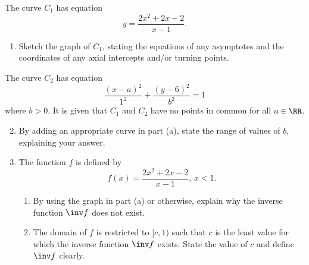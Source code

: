 \begin{problem}
    The curve $C_1$ has equation \[y = \frac{2x^2 + 2x - 2}{x-1}.\]

    \begin{enumerate}
        \item Sketch the graph of $C_1$, stating the equations of any asymptotes and the coordinates of any axial intercepts and/or turning points.
    \end{enumerate}

    The curve $C_2$ has equation \[\frac{(x-a)^2}{1^2} + \frac{(y-6)^2}{b^2} = 1\] where $b > 0$. It is given that $C_1$ and $C_2$ have no points in common for all $a \in \RR$.
    \begin{enumerate}
        \setcounter{enumi}{1}
        \item By adding an appropriate curve in part (a), state the range of values of $b$, explaining your answer.
        \item The function $f$ is defined by \[f(x) = \frac{2x^2+2x-2}{x-1}, \, x < 1.\]
        \begin{enumerate}
            \item By using the graph in part (a) or otherwise, explain why the inverse function $\inv f$ does not exist.
            \item The domain of $f$ is restricted to $[c, 1)$ such that $c$ is the least value for which the inverse function $\inv f$ exists. State the value of $c$ and define $\inv f$ clearly.
        \end{enumerate}
    \end{enumerate}
\end{problem}

